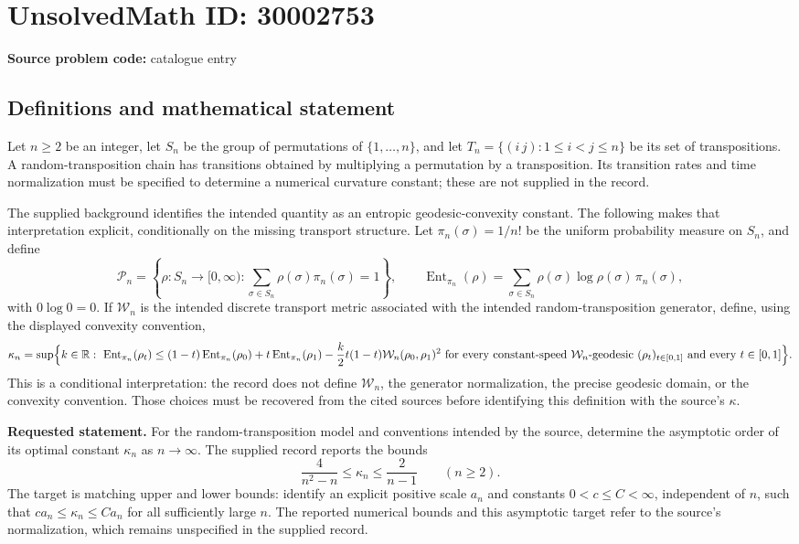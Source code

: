 \documentclass[11pt]{article}
\newcommand{\R}{\mathbb{R}}
\begin{document}
\section*{UnsolvedMath ID: 30002753}
\textbf{Source problem code:} catalogue entry
\subsection{Definitions and mathematical statement}
Let $n\geq 2$ be an integer, let $S_n$ be the group of permutations of $\{1,\ldots,n\}$, and let $T_n=\{(i\,j):1\leq i<j\leq n\}$ be its set of transpositions. A random-transposition chain has transitions obtained by multiplying a permutation by a transposition. Its transition rates and time normalization must be specified to determine a numerical curvature constant; these are not supplied in the record.

The supplied background identifies the intended quantity as an entropic geodesic-convexity constant. The following makes that interpretation explicit, conditionally on the missing transport structure. Let $\pi_n(\sigma)=1/n!$ be the uniform probability measure on $S_n$, and define
\[
\mathcal P_n=\left\{\rho:S_n\to[0,\infty):\sum_{\sigma\in S_n}\rho(\sigma)\pi_n(\sigma)=1\right\},\qquad
\operatorname{Ent}_{\pi_n}(\rho)=\sum_{\sigma\in S_n}\rho(\sigma)\log\rho(\sigma)\,\pi_n(\sigma),
\]
with $0\log 0=0$. If $\mathcal W_n$ is the intended discrete transport metric associated with the intended random-transposition generator, define, using the displayed convexity convention,
\[
\kappa_n=\sup\Bigl\{k\in\R:\ 
\operatorname{Ent}_{\pi_n}(\rho_t)\leq
(1-t)\operatorname{Ent}_{\pi_n}(\rho_0)+t\operatorname{Ent}_{\pi_n}(\rho_1)
-\frac{k}{2}t(1-t)\mathcal W_n(\rho_0,\rho_1)^2
\ \text{for every constant-speed $\mathcal W_n$-geodesic $(\rho_t)_{t\in[0,1]}$ and every $t\in[0,1]$}\Bigr\}.
\]
This is a conditional interpretation: the record does not define $\mathcal W_n$, the generator normalization, the precise geodesic domain, or the convexity convention. Those choices must be recovered from the cited sources before identifying this definition with the source's $\kappa$.

\textbf{Requested statement.} For the random-transposition model and conventions intended by the source, determine the asymptotic order of its optimal constant $\kappa_n$ as $n\to\infty$. The supplied record reports the bounds
\[
\frac{4}{n^2-n}\leq\kappa_n\leq\frac{2}{n-1}\qquad(n\geq2).
\]
The target is matching upper and lower bounds: identify an explicit positive scale $a_n$ and constants $0<c\leq C<\infty$, independent of $n$, such that $c a_n\leq\kappa_n\leq C a_n$ for all sufficiently large $n$. The reported numerical bounds and this asymptotic target refer to the source's normalization, which remains unspecified in the supplied record.
\end{document}

